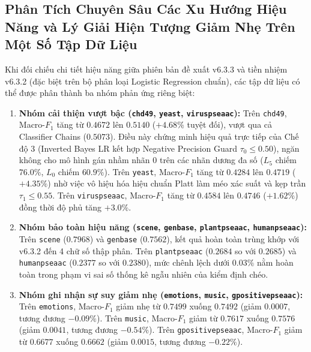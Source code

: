 \documentclass[10pt,a4paper,twoside]{article}
\begin{document}
\subsection{Phân Tích Chuyên Sâu Các Xu Hướng Hiệu Năng và Lý Giải Hiện Tượng Giảm Nhẹ Trên Một Số Tập Dữ Liệu}
Khi đối chiếu chi tiết hiệu năng giữa phiên bản đề xuất v6.3.3 và tiền nhiệm v6.3.2 (đặc biệt trên bộ phân loại Logistic Regression chuẩn), các tập dữ liệu có thể được phân thành ba nhóm phản ứng riêng biệt:
\begin{enumerate}[leftmargin=*]
    \item \textbf{Nhóm cải thiện vượt bậc (\texttt{chd49}, \texttt{yeast}, \texttt{viruspseaac}):}         Trên \texttt{chd49}, Macro-$F_1$ tăng từ $0.4672$ lên $0.5140$ ($+4.68\%$ tuyệt đối), vượt qua cả Classifier Chains ($0.5073$).         Điều này chứng minh hiệu quả trực tiếp của Chế độ 3 (Inverted Bayes LR kết hợp Negative Precision Guard $\tau_0 \le 0.50$),         ngăn không cho mô hình gán nhầm nhãn 0 trên các nhãn dương đa số ($L_5$ chiếm $76.0\%$, $L_0$ chiếm $60.9\%$).         Trên \texttt{yeast}, Macro-$F_1$ tăng từ $0.4284$ lên $0.4719$ ($+4.35\%$) nhờ việc vô hiệu hóa hiệu chuẩn Platt làm méo xác suất         và kẹp trần $\tau_1 \le 0.55$. Trên \texttt{viruspseaac}, Macro-$F_1$ tăng từ $0.4584$ lên $0.4746$ ($+1.62\%$) đồng thời độ phủ tăng $+3.0\%$.
    \item \textbf{Nhóm bảo toàn hiệu năng (\texttt{scene}, \texttt{genbase}, \texttt{plantpseaac}, \texttt{humanpseaac}):}         Trên \texttt{scene} ($0.7968$) và \texttt{genbase} ($0.7562$), kết quả hoàn toàn trùng khớp với v6.3.2 đến 4 chữ số thập phân.         Trên \texttt{plantpseaac} ($0.2684$ so với $0.2685$) và \texttt{humanpseaac} ($0.2377$ so với $0.2380$), mức chênh lệch dưới $0.03\%$         nằm hoàn toàn trong phạm vi sai số thống kê ngẫu nhiên của kiểm định chéo.
    \item \textbf{Nhóm ghi nhận sự suy giảm nhẹ (\texttt{emotions}, \texttt{music}, \texttt{gpositivepseaac}):}         Trên \texttt{emotions}, Macro-$F_1$ giảm nhẹ từ $0.7499$ xuống $0.7492$ (giảm $0.0007$, tương đương $-0.09\%$).         Trên \texttt{music}, Macro-$F_1$ giảm từ $0.7617$ xuống $0.7576$ (giảm $0.0041$, tương đương $-0.54\%$).         Trên \texttt{gpositivepseaac}, Macro-$F_1$ giảm từ $0.6677$ xuống $0.6662$ (giảm $0.0015$, tương đương $-0.22\%$).
\end{enumerate}
\end{document}
